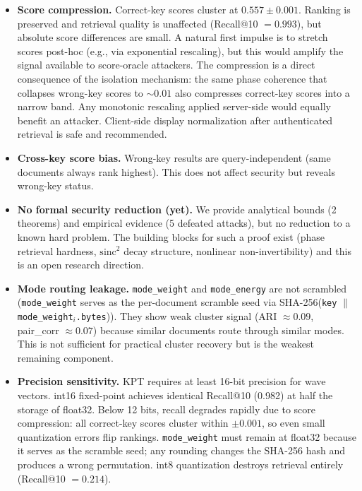 \documentclass{article}
\begin{document}
\begin{itemize}
  \item \textbf{Score compression.}
    Correct-key scores cluster at $0.557 \pm 0.001$.
    Ranking is preserved and retrieval quality is unaffected (Recall@10 $= 0.993$), but absolute score differences are small.
    A natural first impulse is to stretch scores post-hoc (e.g., via exponential rescaling), but this would amplify the signal available to score-oracle attackers.
    The compression is a direct consequence of the isolation mechanism: the same phase coherence that collapses wrong-key scores to ${\sim}0.01$ also compresses correct-key scores into a narrow band.
    Any monotonic rescaling applied server-side would equally benefit an attacker.
    Client-side display normalization after authenticated retrieval is safe and recommended.

  \item \textbf{Cross-key score bias.}
    Wrong-key results are query-independent (same documents always rank highest).
    This does not affect security but reveals wrong-key status.

  \item \textbf{No formal security reduction (yet).}
    We provide analytical bounds (2 theorems) and empirical evidence (5 defeated attacks), but no reduction to a known hard problem.
    The building blocks for such a proof exist (phase retrieval hardness, $\mathrm{sinc}^2$ decay structure, nonlinear non-invertibility) and this is an open research direction.

  \item \textbf{Mode routing leakage.}
    \texttt{mode\_weight} and \texttt{mode\_energy} are not scrambled (\texttt{mode\_weight} serves as the per-document scramble seed via SHA-256(\texttt{key} $\|$ \texttt{mode\_weight}$_i$\texttt{.bytes})).
    They show weak cluster signal (ARI $\approx 0.09$, pair\_corr $\approx 0.07$) because similar documents route through similar modes.
    This is not sufficient for practical cluster recovery but is the weakest remaining component.

  \item \textbf{Precision sensitivity.}
    KPT requires at least 16-bit precision for wave vectors.
    int16 fixed-point achieves identical Recall@10 (0.982) at half the storage of float32.
    Below 12 bits, recall degrades rapidly due to score compression: all correct-key scores cluster within $\pm 0.001$, so even small quantization errors flip rankings.
    \texttt{mode\_weight} must remain at float32 because it serves as the scramble seed; any rounding changes the SHA-256 hash and produces a wrong permutation.
    int8 quantization destroys retrieval entirely (Recall@10 $= 0.214$).
\end{itemize}
\end{document}
